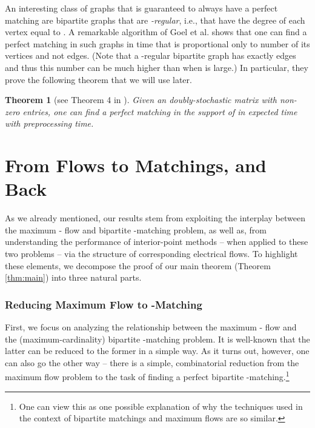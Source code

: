 \documentclass[11pt, letterpaper]{article}
\newtheorem{theorem}{Theorem}[section]
\begin{document}
An interesting class of graphs that is guaranteed to always have a perfect matching are bipartite graphs that are \emph{-regular}, i.e., that have the degree of each vertex equal to . A remarkable algorithm of Goel et al. \cite{GoelKK10} shows that one can find a perfect matching in such graphs in time that is proportional only to number of its vertices and not edges. (Note that a -regular bipartite graph has exactly  edges and thus this number can be much higher than  when  is large.) In particular, they prove the following theorem that we will use later. 

\begin{theorem}[see Theorem 4 in \cite{GoelKK10}]\label{thm:regular_bipartite_matchings}
Given an  doubly-stochastic matrix  with  non-zero entries, one can find a perfect matching in the support of  in  expected time with  preprocessing time.
\end{theorem}





 \section{From Flows to Matchings, and Back}\label{sec:outline}


As we already mentioned, our results stem from exploiting the interplay between the maximum - flow and bipartite -matching problem, as well as, from understanding the performance of interior-point methods -- when applied to these two problems -- via the structure of corresponding electrical flows. To highlight these elements, we decompose the proof of our main theorem (Theorem \ref{thm:main}) into three natural parts.

\subsubsection*{Reducing Maximum Flow to -Matching}

First, we focus on analyzing the relationship between the maximum - flow and the (maximum-cardinality) bipartite -matching problem. It is well-known that the latter  can be reduced to the former in a simple way. As it turns out, however, one can also go the other way -- there is a simple, combinatorial reduction from the maximum flow problem to the task of finding a perfect bipartite -matching.\footnote{One can view this as one possible explanation of why the techniques used in the context of bipartite matchings and maximum flows are so similar.} 
\end{document}
